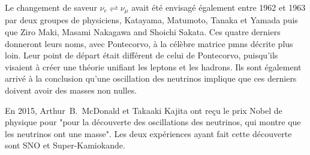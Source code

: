             Le changement de saveur $\nu_e\rightleftharpoons\nu_{\mu}$ avait été envisagé également entre 1962 et 1963 par deux groupes de physiciens, Katayama, Matumoto, Tanaka et Yamada\cite{Nakagawa1963} puis que Ziro Maki, Masami Nakagawa and Shoichi Sakata\cite{Maki1962}. Ces quatre derniers donneront leurs noms, avec Pontecorvo, à la célèbre matrice \gls{pmns} décrite plus loin. Leur point de départ était différent de celui de Pontecorvo, puisqu'ils visaient à créer une théorie unifiant les leptons et les hadrons. Ils sont également arrivé à la conclusion qu'une oscillation des neutrinos implique que ces derniers doivent avoir des masses non nulles.
            
            En 2015, Arthur~B.~McDonald et Takaaki Kajita ont reçu le prix Nobel de physique pour "pour la découverte des oscillations des neutrinos, qui montre que les neutrinos ont une masse". Les deux expériences ayant fait cette découverte sont SNO\cite{Aharmim2013} et Super-Kamiokande\cite{Fukuda1998}.
            
